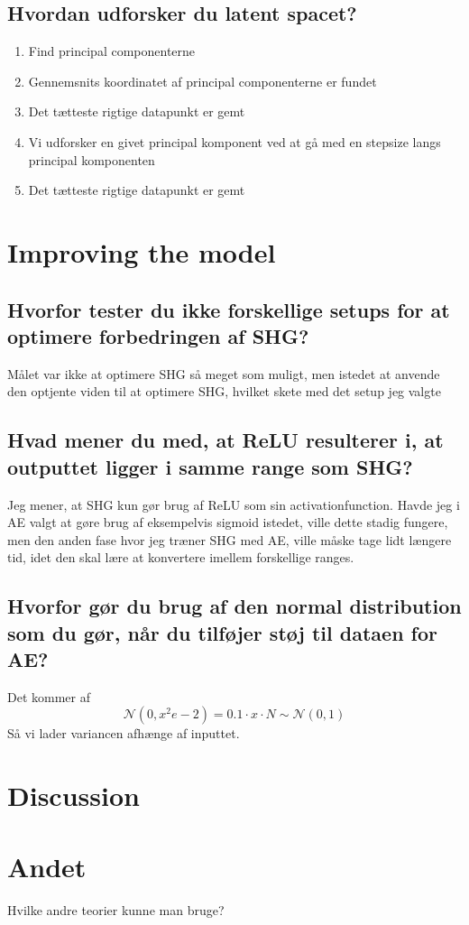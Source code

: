 \documentclass[a4paper]{article}
\begin{document}
\subsection{Hvordan udforsker du latent spacet?}
\begin{enumerate}
    \item Find principal componenterne
    \item Gennemsnits koordinatet af principal componenterne er fundet
    \item Det tætteste rigtige datapunkt er gemt
    \item Vi udforsker en givet principal komponent ved at gå med en stepsize langs principal komponenten
    \item Det tætteste rigtige datapunkt er gemt
\end{enumerate}

\section{Improving the model}
\subsection{Hvorfor tester du ikke forskellige setups for at optimere forbedringen af SHG?}
Målet var ikke at optimere SHG så meget som muligt, men istedet at anvende den optjente viden til at optimere SHG, hvilket skete med det setup jeg valgte

\subsection{Hvad mener du med, at ReLU resulterer i, at outputtet ligger i samme range som SHG?}
Jeg mener, at SHG kun gør brug af ReLU som sin activationfunction. Havde jeg i AE valgt at gøre brug af eksempelvis sigmoid istedet, ville dette stadig fungere, men den anden fase hvor jeg træner SHG med AE, ville måske tage lidt længere tid, idet den skal lære at konvertere imellem forskellige ranges. 

\subsection{Hvorfor gør du brug af den normal distribution som du gør, når du tilføjer støj til dataen for AE?}
Det kommer af
$$\mathcal{N} \left(0, x^2e-2 \right) = 0.1 \cdot x \cdot N \sim \mathcal{N} \left( 0, 1 \right)$$
Så vi lader variancen afhænge af inputtet.

\section{Discussion}

\section{Andet}
Hvilke andre teorier kunne man bruge?
\end{document}
